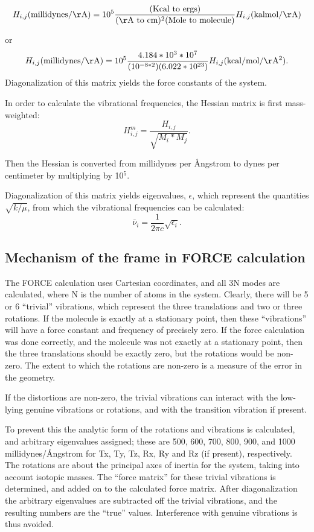 
$$ H_{i,j} (\mathrm{millidynes/\AA}) = 10^5\frac{({\mathrm{Kcal\
to\ ergs}})}
 {(\mathrm{\AA\ to\ cm})^2(\mathrm{Mole\ to\
molecule})} H_{i,j}(\mathrm{kalmol/\AA  })
 $$




or
$$
H_{i,j} (\mathrm{millidynes/\AA}) = 10^5\frac{4.184*10^3*10^7}{(10^{-8*2})
(6.022*10^{23})}H_{i,j}(\mathrm{kcal/mol/\AA ^2}).
$$
Diagonalization of this matrix yields the force constants of the system.

In order to calculate the vibrational frequencies, the Hessian matrix is first
mass-weighted:
$$
H^m_{i,j} = \frac{H_{i,j}}{\sqrt{M_i*M_j}}.
$$

Then the Hessian is converted from millidynes per \AA ngstrom to dynes per
centimeter by multiplying by 10$^5$.

Diagonalization of this matrix yields eigenvalues, $\epsilon$, which represent
the quantities $\sqrt{k/\mu}$, from which the vibrational frequencies can be
calculated:
$$
\bar{\nu}_i = \frac{1}{2\pi c}\sqrt{\epsilon_i}.
$$

\subsection{Mechanism of the frame in FORCE calculation}
The FORCE calculation uses Cartesian coordinates, and all 3N  modes are
calculated, where N is the number of atoms in the system.  Clearly, there will
be 5 or 6 ``trivial'' vibrations,  which  represent  the  three translations
and two or three rotations.  If the molecule is exactly at a stationary point,
then these ``vibrations'' will have a  force  constant and  frequency  of
precisely  zero.   If the force calculation was done correctly, and the
molecule was not exactly at a stationary point,  then the  three  translations
should be exactly zero, but the rotations would be non-zero.  The extent to
which  the  rotations  are  non-zero  is  a measure of the error in the
geometry.

If  the  distortions  are  non-zero,  the  trivial  vibrations  can interact
with  the  low-lying genuine vibrations or rotations, and with the transition
vibration if present.

To prevent this the analytic form of the rotations  and  vibrations is
calculated,  and arbitrary eigenvalues assigned; these are 500, 600, 700, 800,
900, and 1000 millidynes/\AA ngstrom for Tx, Ty, Tz, Rx,  Ry  and Rz  (if
present),  respectively.  The rotations are about the principal axes of inertia
for the system, taking  into  account  isotopic  masses. The ``force matrix''
for these trivial vibrations is determined, and added on to the calculated
force matrix.  After diagonalization the  arbitrary eigenvalues are subtracted
off the trivial vibrations, and the resulting numbers are the ``true'' values.
Interference with genuine vibrations  is thus avoided.


